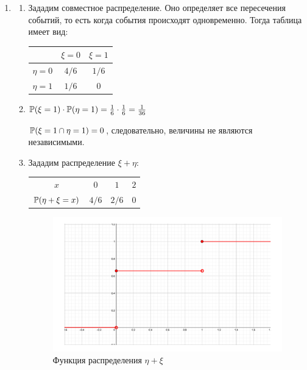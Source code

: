 \begin{enumerate}
\item
\begin{enumerate}


\item
Зададим совместное распределение. Оно определяет все пересечения событий, то есть
когда события происходят одновременно. Тогда таблица имеет вид:

\begin{center}
	\begin{tabular}{ccc}
		\toprule
		      & $\xi = 0$ & $\xi = 1$ \\ \midrule
		$\eta = 0$ & $4/6$ & $1/6 $ \\
		$\eta = 1$ & $1/6$  & 0 \\ \bottomrule
	\end{tabular}
\end{center}


\item
$\P(\xi = 1) \cdot \P(\eta = 1) = \frac{1}{6} \cdot \frac{1}{6} = \frac{1}{36}$

$\P(\xi = 1 \cap \eta = 1) = 0$, следовательно, величины не являются независимыми.

\item

Зададим распределение $\xi + \eta$:

\begin{center}
\begin{tabular}{cccc}
\toprule
$x$ & $0$ & $1$ & $2$ \\
$\P(\eta + \xi = x)$ & $4/6$ & $2/6$ & $0$ \\ 
\bottomrule
\end{tabular}
\end{center}

\begin{figure}[ht!]
	\centering
	\includegraphics[width= 100mm]{images/kr1_2018.pdf}
	\caption{Функция распределения $\eta + \xi$}
\end{figure}



\end{enumerate}
\end{enumerate}
